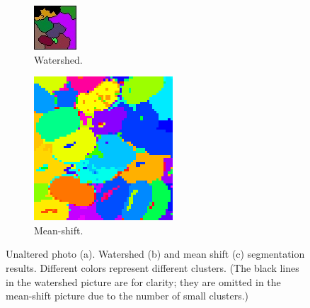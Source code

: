 \documentclass[12pt]{article}
\begin{document}
\begin{figure}
\begin{subfigure}[b]{0.3\textwidth}
      \includegraphics[width=\textwidth]{fig/wshed3}
      \caption{Watershed.}
  \end{subfigure}
   \begin{subfigure}[b]{0.3\textwidth}
      \includegraphics[width=\textwidth]{fig/ms3}
      \caption{Mean-shift.}
  \end{subfigure}
  \caption{Unaltered photo (a). Watershed (b) and mean shift (c) segmentation results. Different colors represent different clusters. (The black lines in the watershed picture are for clarity; they are omitted in the mean-shift picture due to the number of small clusters.)}
  \label{fig:unalt}
  \end{figure}
\end{document}
